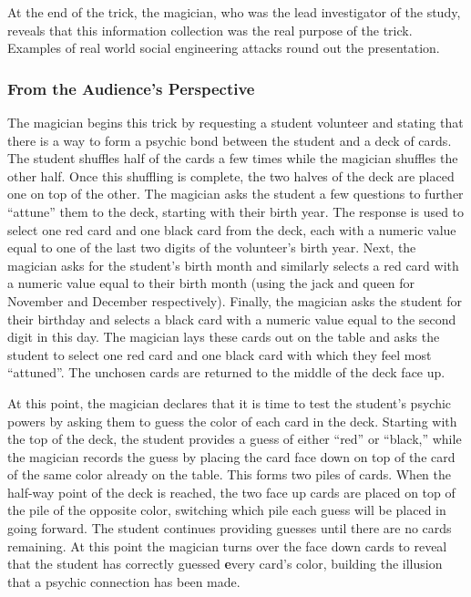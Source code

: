 At the end of the trick, the magician, who was the lead investigator of the
study, reveals that this information collection was the real purpose of the
trick.  Examples of real world social engineering attacks round out the
presentation.

\subsubsection{From the Audience's Perspective}

The magician begins this trick by requesting a student volunteer and stating
that there is a way to form a psychic bond between the student and a deck of
cards.  The student shuffles
half of the cards a few times while the magician shuffles the other half.  Once
this shuffling is complete, the two halves of the deck are placed
one on top of the other.
The magician asks the student
a few questions to further ``attune'' them to the deck,
starting with their birth year.
The response
is used to select one red card and one black card from the deck,
each with a numeric value equal to one of the last two digits of
the volunteer's birth year.
Next, the magician asks for the student's birth month and similarly selects
a red card with a numeric value equal
to their birth month (using the jack and queen for November and December
respectively).
Finally, the magician asks the student
for their birthday and selects a black card with a numeric value
equal to the second digit in this day.
The magician lays these cards out on the table and asks the student to select
one red card and one black card with which they feel most ``attuned''.
The unchosen cards are returned to the middle
of the deck face up.

At this point, the magician declares
that it is time to test the student's psychic powers by asking them to
guess the color of each card in the deck.  Starting with the top of the deck,
the student provides a guess of either ``red'' or ``black,''  while the magician
records the guess by placing the card face down on top of the card of the same
color already on the table.  This forms two piles of cards.  When the half-way
point of the deck is reached, the two face up cards are placed on top of the
pile of the opposite color,
switching which pile each guess
will be placed in going forward.  The student continues providing guesses until
there are no cards remaining.  At this point the magician turns over the face
down cards to reveal that the student has correctly guessed {\textbf every}
card's color, building the illusion that a psychic connection has been made.

